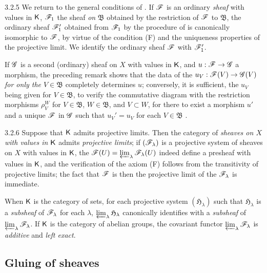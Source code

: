 \begin{env}{3.2.5}
\label{env-0.3.2.5}
We return to the general conditions of . If $\mathscr{F}$ is an ordinary
\emph{sheaf} with values in $\mathsf{K}$, $\mathscr{F}_1$ the sheaf \emph{on} $\mathfrak{B}$ obtained
by the restriction of $\mathscr{F}$ to $\mathfrak{B}$, the ordinary sheaf $\mathscr{F}_1'$ obtained
from $\mathscr{F}_1$ by the procedure of  is canonically isomorphic to $\mathscr{F}$,
by virtue of the condition (F) and the uniqueness properties of the projective limit. We
identify the ordinary sheaf $\mathscr{F}$ with $\mathscr{F}_1'$.

If $\mathscr{G}$ is a second (ordinary) sheaf on $X$ with values in $\mathsf{K}$, and $u:\mathscr{F}\to\mathscr{G}$
a morphism, the preceding remark shows that the data of the $u_V:\mathscr{F}(V)\to\mathscr{G}(V)$
\emph{for only the $V\in\mathfrak{B}$} completely determines $u$; conversely, it is
sufficient, the $u_V$ being given for $V\in\mathfrak{B}$, to verify the commutative
diagram with the restriction morphisms $\rho_V^W$ for $V\in\mathfrak{B}$, $W\in\mathfrak{B}$,
and $V\subset W$, for there to exist a morphism $u'$ and a unique $\mathscr{F}$ in $\mathscr{G}$ such
that $u_V'=u_V$ for each $V\in\mathfrak{B}$ .
\end{env}

\begin{env}{3.2.6}
\label{env-0.3.2.6}
Suppose that $\mathsf{K}$ admits projective limits. Then the category of \emph{sheaves on $X$
with values in $\mathsf{K}$} admits \emph{projective limits}; if $(\mathscr{F}_\lambda)$ is a
projective system of sheaves on $X$ with values in $\mathsf{K}$, the
$\mathscr{F}(U)=\varprojlim_\lambda\mathscr{F}_\lambda(U)$ indeed define a presheaf with values in
$\mathsf{K}$, and the verification of the axiom (F) follows from the transitivity of projective
limits; the fact that $\mathscr{F}$ is then the projective limit of the $\mathscr{F}_\lambda$ is
immediate.

When $\mathsf{K}$ is the category of sets, for each projective system $(\mathfrak{H}_\lambda)$ such
that $\mathfrak{H}_\lambda$ is a \emph{subsheaf} of $\mathscr{F}_\lambda$ for each $\lambda$,
$\varprojlim_\lambda\mathfrak{H}_\lambda$ canonically identifies with a \emph{subsheaf} of
$\varprojlim_\lambda\mathscr{F}_\lambda$. If $\mathsf{K}$ is the category of abelian groups, the covariant
functor $\varprojlim_\lambda\mathscr{F}_\lambda$ is \emph{additive} and \emph{left exact}.
\end{env}

\subsection{Gluing of sheaves}
\label{0-prelim-3.3}

